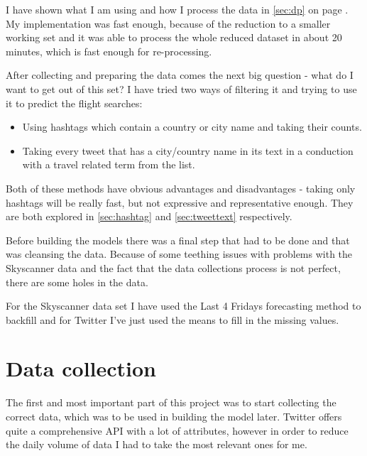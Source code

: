 \documentclass[minf,frontabs,twoside,singlespacing,parskip]{infthesis}
\begin{document}
I have shown what I am using and how I process the data in \ref{sec:dp} on page \pageref{sec:dp}. My implementation was fast enough, because of the reduction to a smaller working set and it was able to process the whole reduced dataset in about 20 minutes, which is fast enough for re-processing.

After collecting and preparing the data comes the next big question - what do I want to get out of this set? I have tried two ways of filtering it and trying to use it to predict the flight searches:
\begin{itemize}
\item Using hashtags which contain a country or city name and taking their counts.
\item Taking every tweet that has a city/country name in its text in a conduction with a travel related term from the list. 
\end{itemize}

Both of these methods have obvious advantages and disadvantages - taking only hashtags will be really fast, but not expressive and representative enough. They are both explored in  \ref{sec:hashtag} and \ref{sec:tweettext} respectively. 


Before building the models there was a final step that had to be done and that was cleansing the data. Because of some teething issues with problems with the Skyscanner data and the fact that the data collections process is not perfect, there are some holes in the data. 


For the Skyscanner data set I have used the Last 4 Fridays forecasting method to backfill and for Twitter I've just used the means to fill in the missing values. 

\section{Data collection}
\label{sec:dc}

The first and most important part of this project was to start collecting the correct data, which was to be used in building the model later. Twitter offers quite a comprehensive API with a lot of attributes, however in order to reduce the daily volume of data I had to take the most relevant ones for me. 
\end{document}

